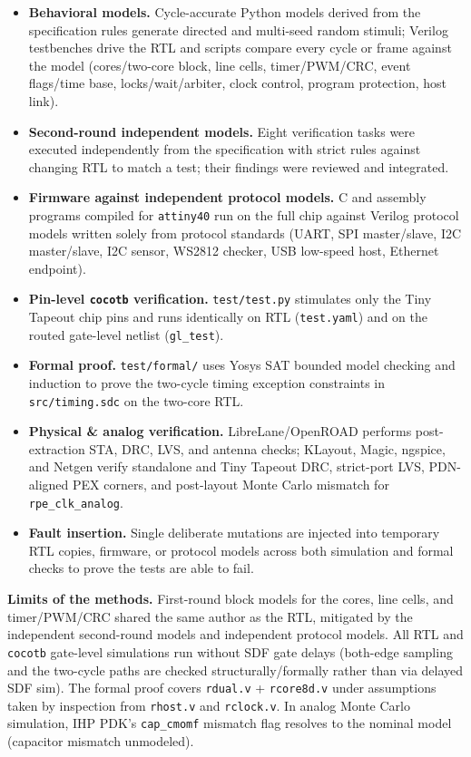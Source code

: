 \documentclass[10pt,a4paper]{article}
\begin{document}
\begin{itemize}
\item \textbf{Behavioral models.} Cycle-accurate Python models derived from the specification rules generate
directed and multi-seed random stimuli; Verilog testbenches drive the RTL and scripts compare every cycle or
frame against the model (cores/two-core block, line cells, timer/PWM/CRC, event flags/time base, locks/wait/arbiter,
clock control, program protection, host link).
\item \textbf{Second-round independent models.} Eight verification tasks were executed independently from the
specification with strict rules against changing RTL to match a test; their findings were reviewed and integrated.
\item \textbf{Firmware against independent protocol models.} C and assembly programs compiled for \texttt{attiny40}
run on the full chip against Verilog protocol models written solely from protocol standards (UART, SPI master/slave,
I2C master/slave, I2C sensor, WS2812 checker, USB low-speed host, Ethernet endpoint).
\item \textbf{Pin-level \texttt{cocotb} verification.} \texttt{test/test.py} stimulates only the Tiny Tapeout chip
pins and runs identically on RTL (\texttt{test.yaml}) and on the routed gate-level netlist (\texttt{gl\_test}).
\item \textbf{Formal proof.} \texttt{test/formal/} uses Yosys SAT bounded model checking and induction to prove
the two-cycle timing exception constraints in \texttt{src/timing.sdc} on the two-core RTL.
\item \textbf{Physical \& analog verification.} LibreLane/OpenROAD performs post-extraction STA, DRC, LVS, and
antenna checks; KLayout, Magic, ngspice, and Netgen verify standalone and Tiny Tapeout DRC, strict-port LVS,
PDN-aligned PEX corners, and post-layout Monte Carlo mismatch for \texttt{rpe\_clk\_analog}.
\item \textbf{Fault insertion.} Single deliberate mutations are injected into temporary RTL copies, firmware,
or protocol models across both simulation and formal checks to prove the tests are able to fail.
\end{itemize}

\textbf{Limits of the methods.} First-round block models for the cores, line cells, and timer/PWM/CRC shared the
same author as the RTL, mitigated by the independent second-round models and independent protocol models. All RTL
and \texttt{cocotb} gate-level simulations run without SDF gate delays (both-edge sampling and the two-cycle paths
are checked structurally/formally rather than via delayed SDF sim). The formal proof covers \texttt{rdual.v} +
\texttt{rcore8d.v} under assumptions taken by inspection from \texttt{rhost.v} and \texttt{rclock.v}. In analog Monte
Carlo simulation, IHP PDK's \texttt{cap\_cmomf} mismatch flag resolves to the nominal model (capacitor mismatch unmodeled).
\end{document}
